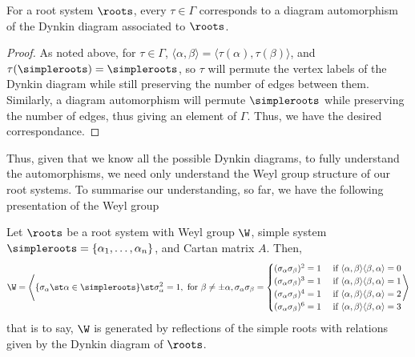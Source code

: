 \documentclass[11pt,leqno,oneside]{amsart}
\numberwithin{thm}{section}
\begin{document}
\begin{prop}
  For a root system \(\roots\), every \(\tau \in \Gamma\) corresponds
  to a diagram automorphism of the Dynkin diagram associated to \(\roots\).
\end{prop}
\begin{proof}
  As noted above, for \(\tau \in \Gamma\), \(\langle
\alpha,\beta \rangle = \langle \tau(\alpha), \tau(\beta) \rangle\),
and \(\tau(\simpleroots) = \simpleroots\), so \(\tau\) will permute
the vertex labels of the Dynkin diagram while still preserving the
number of edges between them. Similarly, a diagram automorphism will
permute \(\simpleroots\) while preserving the number of edges, thus
giving an element of \(\Gamma\). Thus,
we have the desired correspondance.
\end{proof}
Thus, given that we know all the possible Dynkin diagrams, to fully
understand the automorphisms, we need only understand the Weyl group
structure of our root systems. To summarise our understanding, so far,
we have the following presentation of the Weyl group
\begin{prop}
  Let \(\roots\) be a root system with Weyl group \(\W\), simple
  system \(\simpleroots = \{\alpha_1, \ldots, \alpha_n\}\), and Cartan
  matrix \(A\). Then, \[
    \W = \left\langle \{\sigma_\alpha \st \alpha \in \simpleroots\}
      \st \sigma_\alpha^2 = 1, \text{ for }\beta \neq \pm \alpha,
    \sigma_\alpha \sigma_\beta =
      \begin{cases}
        (\sigma_\alpha \sigma_\beta)^2 = 1
        & \text{ if }\langle \alpha,\beta \rangle\langle \beta,\alpha \rangle =
        0\\
        (\sigma_\alpha \sigma_\beta)^3 = 1
        & \text{ if } \langle \alpha,\beta \rangle\langle \beta,\alpha \rangle =
        1\\
        (\sigma_\alpha \sigma_\beta)^4 = 1
        & \text{ if } \langle \alpha,\beta \rangle\langle \beta,\alpha \rangle =
        2\\
        (\sigma_\alpha \sigma_\beta)^6 = 1
        & \text{ if } \langle \alpha,\beta \rangle\langle \beta,\alpha \rangle =
        3
      \end{cases}
\right\rangle
\]
that is to say, \(\W\) is generated by reflections of the simple roots
with relations given by the Dynkin diagram of \(\roots\).
\end{prop}
\end{document}
